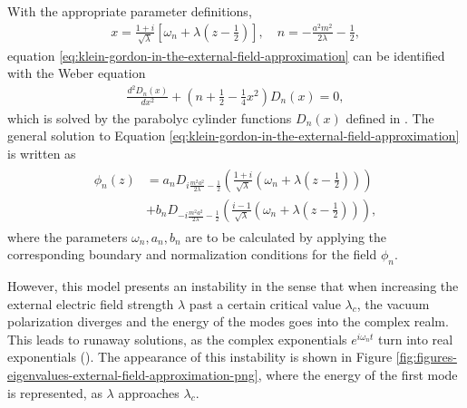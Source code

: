 		With the appropriate parameter definitions, 
		\begin{align}
			x = \frac{1+i}{\sqrt{\lambda} } \left[ \omega_n + \lambda \left(z - \frac{1}{2}\right) \right] , \,\,\,\,\,\, n = -\frac{a^2m^2}{2\lambda} - \frac{1}{2},
		\end{align}
		equation \eqref{eq:klein-gordon-in-the-external-field-approximation}  can be identified with the Weber equation 
		\begin{align}
			 \frac{d^2 D_n(x)}{dx^2} + \left(n+ \frac{1}{2 }-\frac{1}{4}x^2\right) D_n(x) = 0,
			 \label{eq:Weber-equation}
		\end{align}
		which is solved by the parabolyc cylinder functions $D_n(x)$ defined in \cite{Whittaker_Watson_1996}.
		The general solution to Equation \eqref{eq:klein-gordon-in-the-external-field-approximation} is written as
\begin{align}
	\begin{split}
	\phi_n(z) &= 
	a_n D_{i \frac{m^2a^2}{2\lambda} - \frac{1}{2}} \left( 
		\frac{1+i}{\sqrt{\lambda} }
		\left( \omega_n + \lambda \left( z-\frac{1}{2} \right)
		\right) 
	\right)  \\
	&+
	b_n D_{-i \frac{m^2 a^2}{2\lambda} - \frac{1}{2}} \left( 
		\frac{i - 1}{\sqrt{\lambda} }
		\left( \omega_n + \lambda \left( z-\frac{1}{2} \right)
		\right) 
	\right),
	\end{split}
	\label{eq:parabolyc-cylinder}
\end{align}
where the parameters $\omega_n, a_n, b_n$ are to be calculated by applying the corresponding boundary and normalization conditions for the field $\phi_n$.


However, this model presents an instability in the sense that when increasing the external electric field strength $\lambda$ past a certain critical value $\lambda_c$, the vacuum polarization diverges and the energy of the modes goes into the complex realm. This leads to runaway solutions, as the complex exponentials  $e^{i \omega_n t }$ turn into real exponentials (\cite{Ambj1983}). The appearance of this instability is shown in Figure \ref{fig:figures-eigenvalues-external-field-approximation-png}, where the energy of the first mode is represented, as $\lambda$ approaches $\lambda_c$. 

